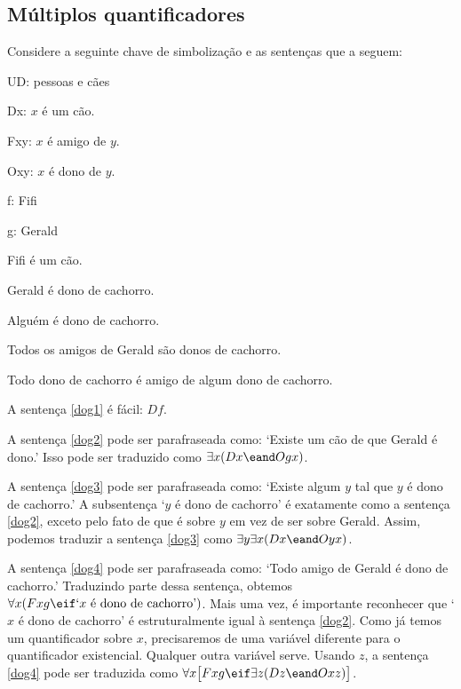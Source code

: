 \subsection{Múltiplos quantificadores}
Considere a seguinte chave de simbolização e as sentenças que a seguem:
\begin{ekey}
\item{UD:} pessoas e cães
\item{Dx:} $x$ é um cão.
\item{Fxy:} $x$ é amigo de $y$.
\item{Oxy:} $x$ é dono de $y$.
\item{f:} Fifi
\item{g:} Gerald
\end{ekey}

\begin{earg}
\item[\ex{dog1}] Fifi é um cão.
\item[\ex{dog2}] Gerald é dono de cachorro.
\item[\ex{dog3}] Alguém é dono de cachorro.
\item[\ex{dog4}] Todos os amigos de Gerald são donos de cachorro.
\item[\ex{dog5}] Todo dono de cachorro é amigo de algum dono de cachorro.
\end{earg}

A sentença \ref{dog1} é fácil: $Df$.

A sentença \ref{dog2} pode ser parafraseada como: `Existe um cão de que Gerald é dono.' Isso pode ser traduzido como $\exists x(Dx \eand Ogx)$.

A sentença \ref{dog3} pode ser parafraseada como: `Existe algum $y$ tal que $y$ é dono de cachorro.' A subsentença `$y$ é dono de cachorro' é exatamente como a sentença \ref{dog2}, exceto pelo fato de que é sobre $y$ em vez de ser sobre Gerald. Assim, podemos traduzir a sentença \ref{dog3} como $\exists y \exists x(Dx \eand Oyx)$. 

A sentença \ref{dog4} pode ser parafraseada como: `Todo amigo de Gerald é dono de cachorro.' Traduzindo parte dessa sentença, obtemos $\forall x(Fxg \eif\mbox{`$x$ é dono de cachorro'})$. Mais uma vez, é importante reconhecer que `$x$ é dono de cachorro' é estruturalmente igual à sentença \ref{dog2}. Como já temos um quantificador sobre $x$, precisaremos de uma variável diferente para o quantificador existencial. Qualquer outra variável serve. Usando $z$, a sentença \ref{dog4} pode ser traduzida como $\forall x\bigl[Fxg \eif\exists z(Dz \eand Oxz)\bigr]$.

